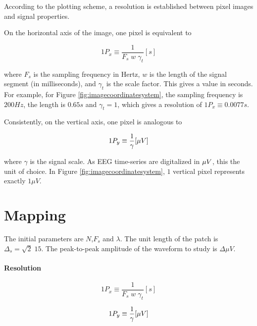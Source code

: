 According to the plotting scheme, a resolution is established between pixel images and signal properties.

On the horizontal axis of the image, one pixel is equivalent to 

\begin{equation}
1 P_x \equiv \frac{1}{F_s \; w \; \gamma_t}  [\si{s}]
\label{eq:resolutionx}
\end{equation}

\noindent where $F_s$ is the sampling frequency in Hertz, $w$ is the length of the signal segment (in milliseconds), and $\gamma_t$ is the scale factor.  This gives a value in seconds.  For example, for Figure \ref{fig:imagecoordinatesystem}, the sampling frequency is $200 Hz$, the length is $0.65 s$ and $\gamma_t = 1$, which gives a resolution of $1 P_x \equiv 0.0077 s$. 

Consistently, on the vertical axis, one pixel is analogous to 

\begin{equation}
1 P_y \equiv \frac{1}{\gamma}  [\si\mu{V}]
\label{eq:resolutiony}
\end{equation}

\noindent where $\gamma$ is the signal scale.  As EEG time-series are digitalized in $\si\mu{V}$, this the unit of choice.  In Figure \ref{fig:imagecoordinatesystem}, $1$ vertical pixel represents exactly $1 \mu V$.

\section{Mapping}

The initial parameters are $N$,$F_s$ and $\lambda$.  The unit length of the patch is $\Delta_s = \sqrt{2} \; 15$.  The peak-to-peak amplitude of the waveform to study is $ \Delta \mu V $.

\paragraph{Resolution}

\begin{equation}
1 P_x \equiv \frac{1}{F_s \; w \; \gamma_t}  [\si{s}]
\label{eq:resolutionx}
\end{equation}

\begin{equation}
1 P_y \equiv \frac{1}{\gamma}  [\si\mu{V}]
\label{eq:resolutiony}
\end{equation}

